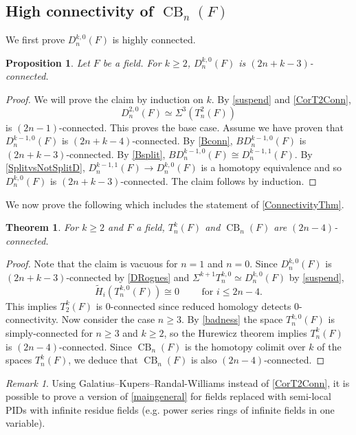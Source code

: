 \documentclass[a4paper]{amsart}
\DeclareMathOperator{\CB}{CB}
\newcommand{\m}{\to}
\numberwithin{theoremcounter}{section}
\newtheorem{theorem}[theoremauto]{Theorem}
\newtheorem{proposition}[propositionauto]{Proposition}
\theoremstyle{definition}
\theoremstyle{remark}
\newtheorem{remark}[remarkauto]{Remark}
\begin{document}
\subsection{High connectivity of ${\CB}_n(F)$}

We first prove $D_n^{k,0}(F)$ is highly connected.

\begin{proposition} \label{DRognes}
Let $F$ be a field. For $k \geq 2$, $D_n^{k,0}(F)$ is $(2n+k-3)$-connected. 
\end{proposition}

\begin{proof}
We will prove the claim by induction on $k$. By \autoref{suspend} and  \autoref{CorT2Conn},  $$D_n^{2,0}(F) \simeq \Sigma^3 (T^2_n(F))$$   is $(2n-1)$-connected. This proves the base case. Assume we have proven that $D_n^{k-1,0}(F)$ is $(2n+k-4)$-connected. By \autoref{Bconn}, $BD_n^{k-1,0}(F)$ is $(2n+k-3)$-connected. By \autoref{Bsplit}, $BD_n^{k-1,0}(F) \cong D_n^{k-1,1}(F)$. By \autoref{SplitvsNotSplitD},  $D_n^{k-1,1}(F) \m D_n^{k,0}(F)$ is a homotopy equivalence and so $D_n^{k,0}(F)$ is $(2n+k-3)$-connected. The claim follows by induction.
\end{proof}

We now prove the following which includes the statement of \autoref{ConnectivityThm}.

\begin{theorem}\label{maingeneral}
For $k \geq 2$ and $F$ a field, $T_n^k(F)$ and ${\CB}_n(F)$ are $(2n-4)$-connected.
\end{theorem}
\begin{proof}
Note that the claim is vacuous for $n=1$ and $n=0$. Since $D_n^{k,0}(F)$ is $(2n+k-3)$-connected by \autoref{DRognes}   and $\Sigma^{k+1} T_n^{k,0} \simeq D_n^{k,0}(F)$ by \autoref{suspend},  $$\widetilde H_i(T_n^{k,0}(F)) \cong 0 \qquad \text{ for $i \leq 2n-4$.}$$ This implies $T_2^k(F)$ is $0$-connected since reduced homology detects $0$-connectivity. Now consider the case $n \geq 3$. By \autoref{badness} the space $T_n^{k,0}(F)$ is simply-connected for $n \geq 3$ and $k \geq 2$, so the Hurewicz theorem implies $T_n^k(F)$ is $(2n-4)$-connected. Since ${\CB}_n(F)$ is the homotopy colimit over $k$ of the spaces $T_n^k(F)$, we deduce that ${\CB}_n(F)$ is also $(2n-4)$-connected.
\end{proof}

\begin{remark}
Using Galatius--Kupers--Randal-Williams \cite[Theorem 7.1 (ii)]{e2cellsIV} instead of \autoref{CorT2Conn}, it is possible to prove a version of \autoref{maingeneral} for fields replaced with semi-local PIDs with infinite residue fields (e.g. power series rings of infinite fields in one variable).



\end{remark}
\end{document}
